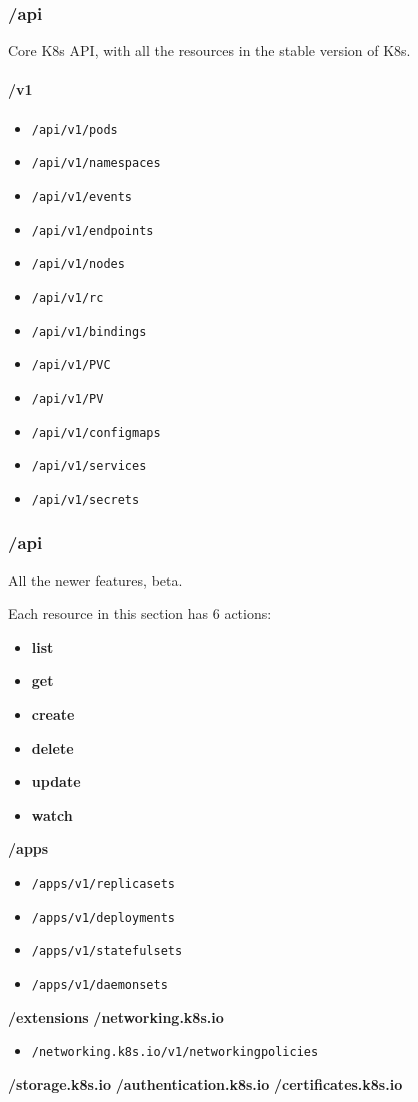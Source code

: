 \documentclass{article}
\begin{document}
\subsubsection{/api}
Core K8s API, with all the resources in the stable version of K8s.

\paragraph{/v1}
\begin{itemize}
    \item \verb|/api/v1/pods|
    \item \verb|/api/v1/namespaces|
    \item \verb|/api/v1/events|
    \item \verb|/api/v1/endpoints|
    \item \verb|/api/v1/nodes|
    \item \verb|/api/v1/rc|
    \item \verb|/api/v1/bindings|
    \item \verb|/api/v1/PVC|
    \item \verb|/api/v1/PV|
    \item \verb|/api/v1/configmaps|
    \item \verb|/api/v1/services|
    \item \verb|/api/v1/secrets|
\end{itemize}

\subsubsection{/api}
All the newer features, beta.

Each resource in this section has 6 actions:
\begin{itemize}
    \item \textbf{list}
    \item \textbf{get}
    \item \textbf{create}
    \item \textbf{delete}
    \item \textbf{update}
    \item \textbf{watch}
\end{itemize}

\textbf{/apps}
\begin{itemize}
    \item \verb|/apps/v1/replicasets|
    \item \verb|/apps/v1/deployments|
    \item \verb|/apps/v1/statefulsets|
    \item \verb|/apps/v1/daemonsets|
\end{itemize}
\textbf{/extensions}
\textbf{/networking.k8s.io}
\begin{itemize}
    \item \verb|/networking.k8s.io/v1/networkingpolicies|
\end{itemize}
\textbf{/storage.k8s.io}
\textbf{/authentication.k8s.io}
\textbf{/certificates.k8s.io}
\end{document}
